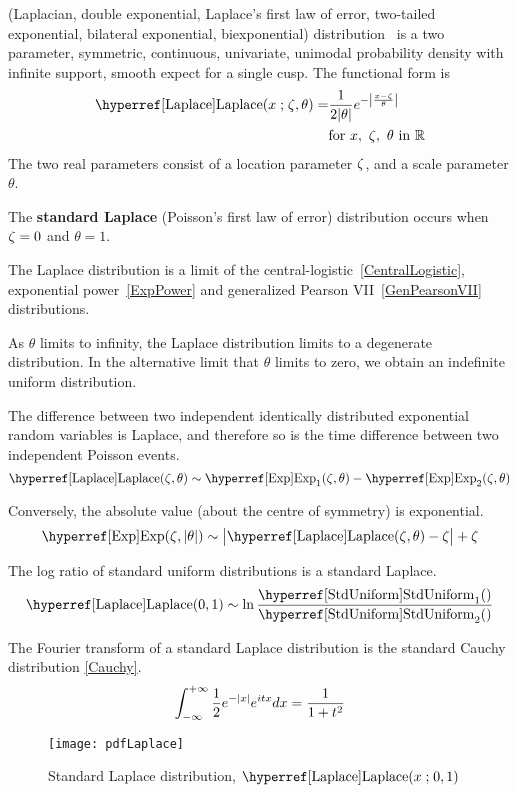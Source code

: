 

\label{sec:Laplace}
 (Laplacian, double exponential, Laplace's first law of error, two-tailed exponential, bilateral exponential, biexponential) distribution~\cite{Laplace1774,Stigler1986,Kotz2001}
 is  a two parameter, symmetric, continuous, univariate, unimodal probability density with infinite support, smooth expect for a single cusp.
The functional form is
\begin{align}
\label{Laplace}
\opr{Laplace}(x\given \pLoc, \theta) = & 
\frac{1}{2 |\theta|} e^{- \Left| \frac{x-\pLoc}{\theta}\Right|} 		\checked
\\
\notag
& \text{for } x,\ \pLoc,\  \theta \text{ in }  \mathbb{R}			\checked
\end{align}
The two real parameters consist of a location parameter $\zeta$,  and a scale parameter $\theta$.




The {\bf standard Laplace} (Poisson's first law of error) distribution occurs when $\zeta=0$ and $\theta=1$.




The Laplace distribution is a limit of the central-logistic~\eqref{CentralLogistic}, exponential power~\eqref{ExpPower} and generalized Pearson VII~\eqref{GenPearsonVII} distributions.

As $\theta$ limits to infinity, the Laplace distribution limits to a degenerate distribution. In the alternative limit that $\theta$ limits to zero, we obtain an indefinite uniform distribution.


The difference between two independent identically distributed exponential random variables is Laplace, and therefore so is the time difference between two independent Poisson events.
\[
\opr{Laplace}(\pLoc, \theta) \sim  \opr{Exp}_1(\pLoc,\theta) - \opr{Exp}_2(\pLoc,\theta)
\checked
\notag
\]

Conversely, the absolute value (about the centre of symmetry) is exponential. 
\[
\opr{Exp}(\pLoc, |\theta|) \sim  \bigl|\opr{Laplace}(\pLoc,\theta) - \pLoc \bigr| +\pLoc
\checked
\notag
\]


The log ratio of standard uniform distributions is a standard Laplace.
\[
\opr{Laplace}(0,1) \sim \ln \frac{\opr{StdUniform}_1() }{\opr{StdUniform}_2()} \checked
\notag
\]


The Fourier transform of a standard Laplace distribution is the standard Cauchy distribution \eqref{Cauchy}.
\[
\int_{-\infty}^{+\infty} \frac{1}{2}e^{-| x |} e^{i t x} dx = \frac{1}{1+t^2}
\checked
\notag
\]



\begin{figure}[t!]
\begin{center}
\texttt{[image: pdfLaplace]}
\end{center}
\caption[Standard Laplace distribution]{Standard Laplace distribution, $\opr{Laplace}(x\given 0,1)$}
\end{figure}


